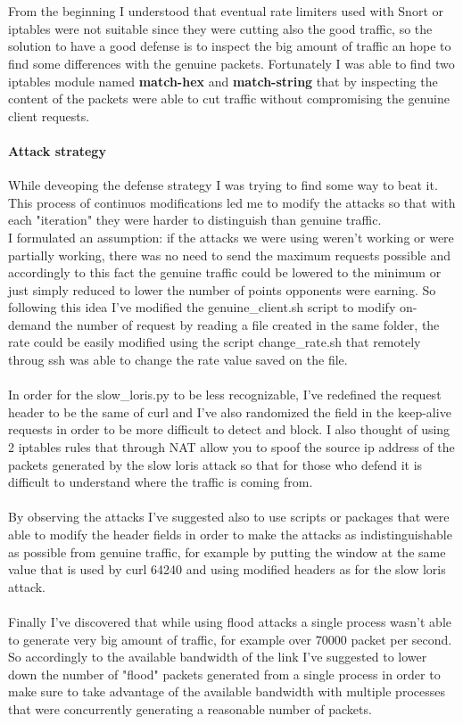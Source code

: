 \documentclass[14pt]{article}
\begin{document}
\\
\\
From the beginning I understood that eventual rate limiters used with Snort or iptables were not suitable since they were cutting also the good traffic, so the solution to have a good defense is to inspect the big amount of traffic an hope to find some differences with the genuine packets. Fortunately I was able to find two iptables module named \textbf{match-hex} and \textbf{match-string} that by inspecting the content of the packets were able to cut traffic without compromising the genuine client requests.


\paragraph{Attack strategy}
While deveoping the defense strategy I was trying to find some way to beat it. This process of continuos modifications led me to modify the attacks so that with each "iteration" they were harder to distinguish than genuine traffic. 
\\
I formulated an assumption: if the attacks  we were using weren't working or were partially working, there was no need to send the maximum requests possible and accordingly to this fact the genuine traffic could be lowered to the minimum or just simply reduced to lower the number of points opponents were earning. So following this idea I've modified the genuine\_client.sh script to modify on-demand the number of request by reading a file created in the same folder, the rate could be easily modified using the script change\_rate.sh that remotely throug ssh was able to change the rate value saved on the file.
\\
\\
In order for the slow\_loris.py to be less recognizable, I've redefined the request header to be the same of curl and I've also randomized the field in the keep-alive requests in order to be more difficult to detect and block. I also thought of using 2 iptables rules that through NAT allow you to spoof the source ip address of the packets generated by the slow loris attack so that for those who defend it is difficult to understand where the traffic is coming from.
\\
\\
By observing the attacks I've suggested also to use scripts or packages that were able to modify the header fields in order to make the attacks as indistinguishable as possible from genuine traffic, for example by putting the window at the same value that is used by curl 64240 and using modified headers as for the slow loris attack.
\\
\\
Finally I've discovered that while using flood attacks a single process wasn't able to generate very big amount of traffic, for example over 70000 packet per second. So accordingly to the available bandwidth of the link I've suggested to lower down the number of "flood" packets generated from a single process in order to make sure to take advantage of the available bandwidth with multiple processes that were concurrently generating a reasonable number of packets.
\end{document}
